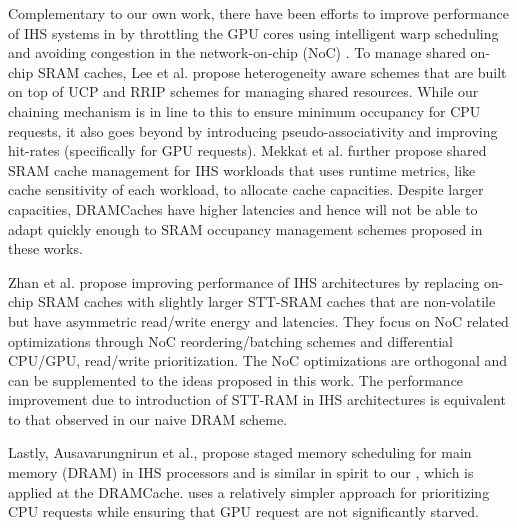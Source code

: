 \par Complementary to our own work, there have been efforts to improve performance of IHS systems in \cite{gpu-concurrency} by throttling the GPU cores using intelligent warp scheduling and avoiding congestion in the network-on-chip (NoC) \cite{interconnect}. To manage shared on-chip SRAM caches, Lee et al. \cite{tap} propose heterogeneity aware schemes that are built on top of UCP and RRIP schemes for managing shared  resources. While our chaining mechanism is in line to this to ensure minimum occupancy for CPU requests, it also goes beyond by introducing pseudo-associativity and improving hit-rates (specifically for GPU requests). Mekkat et al. \cite{helm} further propose shared SRAM cache management for IHS workloads that uses runtime metrics, like cache sensitivity of each workload, to allocate cache capacities. Despite larger capacities, DRAMCaches have higher latencies and hence will not be able to adapt quickly enough to SRAM occupancy management schemes proposed in these works.
\par Zhan et al. \cite{oscar} propose improving performance of IHS architectures by replacing on-chip SRAM caches with slightly larger STT-SRAM caches that are non-volatile but have asymmetric read/write energy and latencies. They focus on NoC related optimizations through NoC reordering/batching schemes and differential CPU/GPU, read/write prioritization. The NoC optimizations are orthogonal and can be supplemented to the ideas proposed in this work. The performance improvement due to introduction of STT-RAM in IHS architectures is equivalent to that observed in our naive DRAM scheme.
\par Lastly, Ausavarungnirun et al., \cite{sms} propose staged memory scheduling for main memory (DRAM) in IHS processors and is similar in spirit to our \prioname, which is applied at the DRAMCache. \prioname uses a relatively simpler approach for prioritizing CPU requests while ensuring that GPU request are not significantly starved. 
